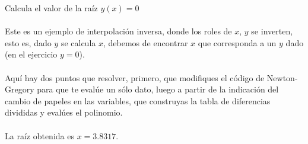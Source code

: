 \documentclass[11pt]{article}
\begin{document}
\begin{enumerate}
Calcula el valor de la ra\'{i}z $y(x)=0$
\\
\\
Este es un ejemplo de interpolaci\'{o}n inversa, donde los roles de $x$, $y$ se inverten, esto es, dado $y$ se calcula $x$, debemos de encontrar $x$ que corresponda a un $y$ dado (en el ejercicio $y=0$).
\\
\\
Aqu\'{i} hay dos puntos que resolver, primero, que modifiques el c\'{o}digo de Newton-Gregory para que te eval\'{u}e un s\'{o}lo dato, luego a partir de la indicaci\'{o}n del cambio de papeles en las variables, que construyas la tabla de diferencias divididas y eval\'{u}es el polinomio.
\\
\\
La ra\'{i}z obtenida es $x=3.8317$.
\end{enumerate}
\end{document}
